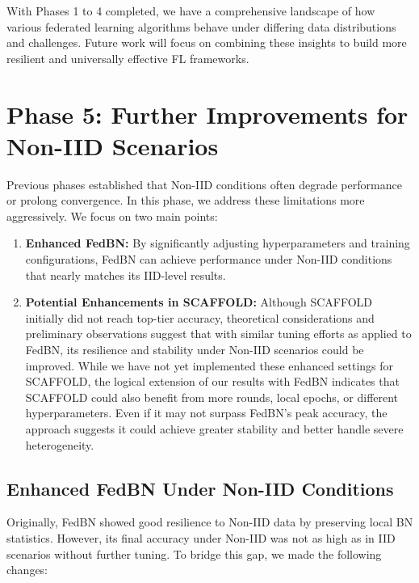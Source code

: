 \documentclass[12pt,a4paper]{report}
\begin{document}
With Phases 1 to 4 completed, we have a comprehensive landscape of how various federated learning algorithms behave under differing data distributions and challenges. Future work will focus on combining these insights to build more resilient and universally effective FL frameworks.
\chapter{Phase 5: Further Improvements for Non-IID Scenarios}

Previous phases established that Non-IID conditions often degrade performance or prolong convergence. In this phase, we address these limitations more aggressively. We focus on two main points:

\begin{enumerate}
	\item \textbf{Enhanced FedBN:} By significantly adjusting hyperparameters and training configurations, FedBN can achieve performance under Non-IID conditions that nearly matches its IID-level results.
	\item \textbf{Potential Enhancements in SCAFFOLD:} Although SCAFFOLD initially did not reach top-tier accuracy, theoretical considerations and preliminary observations suggest that with similar tuning efforts as applied to FedBN, its resilience and stability under Non-IID scenarios could be improved. While we have not yet implemented these enhanced settings for SCAFFOLD, the logical extension of our results with FedBN indicates that SCAFFOLD could also benefit from more rounds, local epochs, or different hyperparameters. Even if it may not surpass FedBN’s peak accuracy, the approach suggests it could achieve greater stability and better handle severe heterogeneity.
\end{enumerate}

\section{Enhanced FedBN Under Non-IID Conditions}

Originally, FedBN showed good resilience to Non-IID data by preserving local BN statistics. However, its final accuracy under Non-IID was not as high as in IID scenarios without further tuning. To bridge this gap, we made the following changes:
\end{document}
